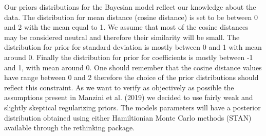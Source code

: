 \documentclass[10pt,dvipsnames,enabledeprecatedfontcommands]{scrartcl}
\begin{document}
Our priors distributions for the Bayesian model reflect our knowledge
about the data. The distribution for mean distance (cosine distance) is
set to be between 0 and 2 with the mean equal to 1. We assume that most
of the cosine distances may be considered neutral and therefore their
similarity will be small. The distribution for prior for standard
deviation is mostly between 0 and 1 with mean around 0. Finally the
distribution for prior for coefficients is mostly between -1 and 1, with
mean around 0. One should remember that the cosine distance values have
range between 0 and 2 therefore the choice of the prior distributions
should reflect this constraint. As we want to verify as objectively as
possible the assumptions present in Manzini et al. (2019) we decided to
use fairly weak and slightly skeptical regularizing priors. The models
parameters will have a posterior distribution obtained using either
Hamiltionian Monte Carlo methods (STAN) available through the rethinking
package.
\end{document}
